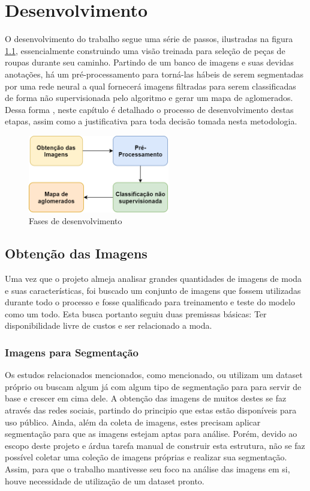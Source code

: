 \documentclass[12pt]{report}
\begin{document}
\chapter{Desenvolvimento}
\label{cha:meto}

O desenvolvimento do trabalho segue uma série de passos, ilustradas na figura \ref{fig:metodo}, essencialmente construindo uma visão treinada para seleção de peças de roupas durante seu caminho. Partindo de um banco de imagens e suas devidas anotações, há um pré-processamento para torná-las hábeis de serem segmentadas por uma rede neural a qual fornecerá imagens filtradas para serem classificadas de forma não supervisionada pelo algoritmo e gerar um mapa de aglomerados. Dessa forma , neste capítulo é detalhado o processo de desenvolvimento destas etapas, assim como a justificativa para toda decisão tomada nesta metodologia. 

\begin{figure}
    \centering
    \includegraphics[width=0.55\textwidth]{images/metodo.png}
    \caption{Fases de desenvolvimento}
    \label{fig:metodo}
\end{figure}

\section{Obtenção das Imagens}

Uma vez que o projeto almeja analisar grandes quantidades de imagens de moda e suas características, foi buscado um conjunto de imagens que fossem utilizadas durante todo o processo e fosse qualificado para treinamento e teste do modelo como um todo. Esta busca portanto seguiu duas premissas básicas: Ter disponibilidade livre de custos e ser relacionado a moda. 

\subsection{Imagens para Segmentação}

Os estudos relacionados mencionados, como mencionado, ou utilizam um dataset próprio ou buscam algum já com algum tipo de segmentação para para servir de base e crescer em cima dele. A obtenção das imagens de muitos destes se faz através das redes sociais, partindo do principio que estas estão disponíveis para uso público. Ainda, além da coleta de imagens, estes precisam aplicar segmentação para que as imagens estejam aptas para análise. Porém, devido ao escopo deste projeto e árdua tarefa manual de construir esta estrutura, não se faz possível coletar uma coleção de imagens próprias e realizar sua segmentação. Assim, para que o trabalho mantivesse seu foco na análise das imagens em si, houve necessidade de utilização de um dataset pronto. 
\end{document}
